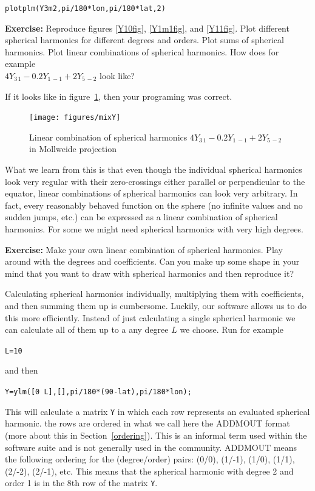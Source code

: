 \documentclass[11pt]{article}
\newcommand{\Yfun}{Y}
\begin{document}
\qquad \verb+plotplm(Y3m2,pi/180*lon,pi/180*lat,2)+

\textbf{Exercise:} Reproduce figures \ref{Y10fig}, \ref{Y1m1fig}, and \ref{Y11fig}. Plot different spherical harmonics for different degrees and orders. Plot sums of spherical harmonics. Plot linear combinations of spherical harmonics. How does for example \\{$4\Yfun_{3\,1} - 0.2\Yfun_{1\,-1} +2\Yfun_{5\,-2}$} look like?

If it looks like in figure~\ref{MixY}, then your programing was
correct.

\begin{figure}[h]%
  \centering
  \texttt{[image: figures/mixY]}
  \caption{Linear combination of spherical harmonics $4\Yfun_{3\,1} - 0.2\Yfun_{1\,-1} +2\Yfun_{5\,-2}$ in Mollweide projection}
  \label{MixY}
\end{figure}

What we learn from this is that even though the individual spherical
harmonics look very regular with their zero-crossings either parallel
or perpendicular to the equator, linear combinations of spherical
harmonics can look very arbitrary. In fact, every reasonably behaved
function on the sphere (no infinite values and no sudden jumps, etc.)
can be expressed as a linear combination of spherical harmonics. For
some we might need spherical harmonics with very high degrees.

\textbf{Exercise:} Make your own linear combination of spherical
harmonics. Play around with the degrees and coefficients. Can you make
up some shape in your mind that you want to draw with spherical
harmonics and then reproduce it?

Calculating spherical harmonics individually, multiplying them with
coefficients, and then summing them up is cumbersome. Luckily, our
software allows us to do this more efficiently. Instead of just
calculating a single spherical harmonic we can calculate all of them
up to a any degree $L$ we choose. Run for example

\quad \verb+L=10+

and then

\quad \verb+Y=ylm([0 L],[],pi/180*(90-lat),pi/180*lon);+

This will calculate a matrix \verb+Y+ in which each row represents an
evaluated spherical harmonic. the rows are ordered in what we call
here the ADDMOUT format (more about this in
Section~\ref{ordering}). This is an informal term used within the
software suite and is not generally used in the community. ADDMOUT
means the following ordering for the (degree/order) pairs: (0/0),
(1/-1), (1/0), (1/1), (2/-2), (2/-1), etc. This means that the
spherical harmonic with degree 2 and order 1 is in the 8th row of the
matrix \verb+Y+.
   
\end{document}
